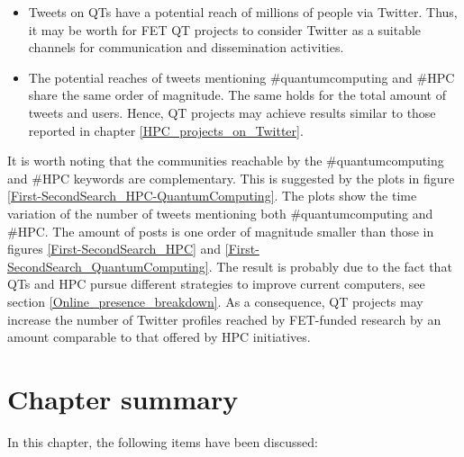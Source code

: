 \begin{itemize}
 \item Tweets on QTs have a potential reach of millions of people via Twitter. Thus, it may be worth for FET QT projects to consider Twitter as a suitable channels for communication and dissemination activities.
 \item The potential reaches of tweets mentioning \#quantumcomputing and \#HPC share the same order of magnitude. The same holds for the total amount of tweets and users. Hence, QT projects may achieve results similar to those reported in chapter \ref{HPC_projects_on_Twitter}. 
\end{itemize}

It is worth noting that the communities reachable by the \#quantumcomputing and \#HPC keywords are complementary. This is suggested by the plots in figure \ref{First-SecondSearch_HPC-QuantumComputing}. The plots show the time variation of the number of tweets mentioning both \#quantumcomputing and \#HPC. The amount of posts is one order of magnitude smaller than those in figures \ref{First-SecondSearch_HPC} and \ref{First-SecondSearch_QuantumComputing}. The result is probably due to the fact that QTs and HPC pursue different strategies to improve current computers, see section \ref{Online_presence_breakdown}. As a consequence, QT projects may increase the number of Twitter profiles reached by FET-funded research by an amount comparable to that offered by HPC initiatives.

\section{Chapter summary} 
In this chapter, the following items have been discussed: 

